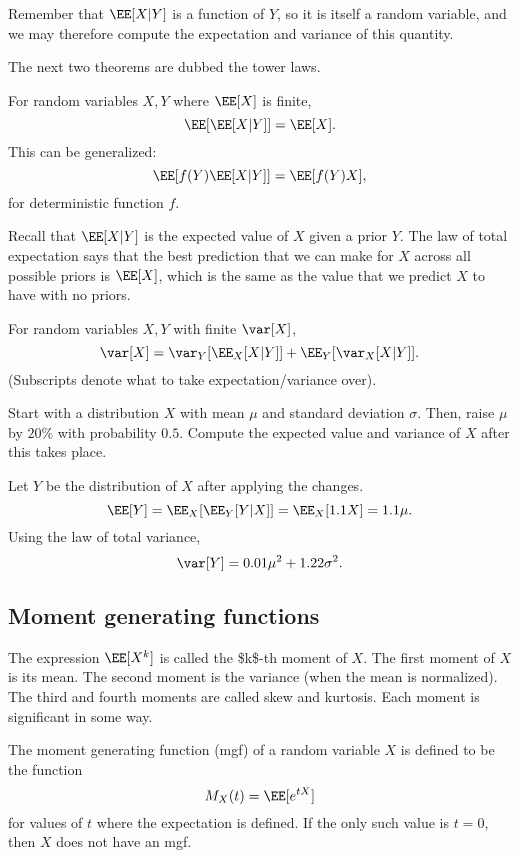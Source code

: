 Remember that $\EE[X\vert Y]$ is a function of $Y$, so it is itself a random variable, and we may therefore compute the expectation and variance of this quantity. 

The next two theorems are dubbed the \ac{tower laws}.
\begin{theorem}

For random variables $X,Y$ where $\EE[X]$ is finite, 
\[\EE[\EE[X\vert Y]] = \EE[X].\]
This can be generalized: 
\[\EE[f(Y)\EE[X\vert Y]] = \EE[f(Y)X],\]
for deterministic function $f$. 
\end{theorem}

Recall that $\EE[X\vert Y]$ is the expected value of $X$ given a prior $Y$. The law of total expectation says that the best prediction that we can make for $X$ across all possible priors is $\EE[X]$, which is the same as the value that we predict $X$ to have with no priors. 

\begin{theorem}

For random variables $X,Y$ with finite $\var[X]$, 
\[\var[X] = \var_Y[\EE_X[X\vert Y]] + \EE_Y[\var_X[X\vert Y]]. \]
(Subscripts denote what to take expectation/variance over).
\end{theorem}

\begin{example}
\exlabel

Start with a distribution $X$ with mean $\mu$ and standard deviation $\sigma$. Then, raise $\mu$ by $20\%$ with probability $0.5$. Compute the expected value and variance of $X$ after this takes place. 
\end{example}

Let $Y$ be the distribution of $X$ after applying the changes. 
\[\EE[Y] = \EE_X[\EE_Y[Y\vert X]] = \EE_X[1.1X] = 1.1\mu.\]
Using the law of total variance, 
\[\var[Y] = 0.01\mu^2 + 1.22\sigma^2.\]

\subsection{Moment generating functions}

The expression $\EE[X^k]$ is called the \ac{$k$-th moment} of $X$. The first moment of $X$ is its mean. The second moment is the variance (when the mean is normalized). The third and fourth moments are called skew and kurtosis. Each moment is significant in some way. 

\begin{definition}

The moment generating function (mgf) of a random variable $X$ is defined to be the function 
\[M_X(t) = \EE[e^{tX}]\]
for values of $t$ where the expectation is defined. If the only such value is $t=0$, then $X$ does not have an mgf. 
\end{definition}

